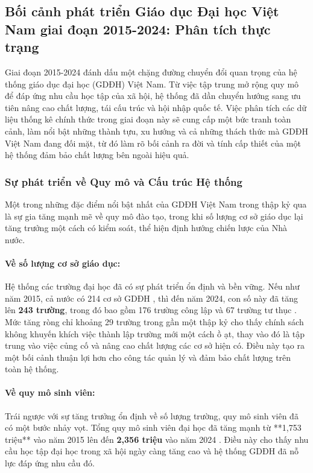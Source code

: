 \documentclass[12pt, a4paper, openany]{report}
\begin{document}

\subsection{Bối cảnh phát triển Giáo dục Đại học Việt Nam giai đoạn 2015-2024: Phân tích thực trạng}

Giai đoạn 2015-2024 đánh dấu một chặng đường chuyển đổi quan trọng của hệ thống giáo dục đại học (GDĐH) Việt Nam. Từ việc tập trung mở rộng quy mô để đáp ứng nhu cầu học tập của xã hội, hệ thống đã dần chuyển hướng sang ưu tiên nâng cao chất lượng, tái cấu trúc và hội nhập quốc tế. Việc phân tích các dữ liệu thống kê chính thức trong giai đoạn này sẽ cung cấp một bức tranh toàn cảnh, làm nổi bật những thành tựu, xu hướng và cả những thách thức mà GDĐH Việt Nam đang đối mặt, từ đó làm rõ bối cảnh ra đời và tính cấp thiết của một hệ thống đảm bảo chất lượng bên ngoài hiệu quả.

\subsubsection{Sự phát triển về Quy mô và Cấu trúc Hệ thống}

Một trong những đặc điểm nổi bật nhất của GDĐH Việt Nam trong thập kỷ qua là sự gia tăng mạnh mẽ về quy mô đào tạo, trong khi số lượng cơ sở giáo dục lại tăng trưởng một cách có kiểm soát, thể hiện định hướng chiến lược của Nhà nước.

\paragraph{Về số lượng cơ sở giáo dục:}
Hệ thống các trường đại học đã có sự phát triển ổn định và bền vững. Nếu như năm 2015, cả nước có 214 cơ sở GDĐH \cite{stat_quy_mo_2015_2021}, thì đến năm 2024, con số này đã tăng lên \textbf{243 trường}, trong đó bao gồm 176 trường công lập và 67 trường tư thục \cite{stat_moet_2024}. Mức tăng ròng chỉ khoảng 29 trường trong gần một thập kỷ cho thấy chính sách không khuyến khích việc thành lập trường mới một cách ồ ạt, thay vào đó là tập trung vào việc củng cố và nâng cao chất lượng các cơ sở hiện có. Điều này tạo ra một bối cảnh thuận lợi hơn cho công tác quản lý và đảm bảo chất lượng trên toàn hệ thống.

\paragraph{Về quy mô sinh viên:}
Trái ngược với sự tăng trưởng ổn định về số lượng trường, quy mô sinh viên đã có một bước nhảy vọt. Tổng quy mô sinh viên đại học đã tăng mạnh từ **1,753 triệu** vào năm 2015 lên đến \textbf{2,356 triệu} vào năm 2024 \cite{stat_moet_2024, stat_quy_mo_2015_2021}. Điều này cho thấy nhu cầu học tập đại học trong xã hội ngày càng tăng cao và hệ thống GDĐH đã nỗ lực đáp ứng nhu cầu đó.
\end{document}
